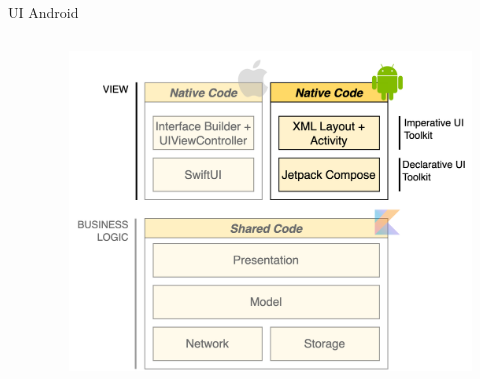 \begin{frame}{UI Android}
    \begin{columns}[onlytextwidth]
        \begin{column}{0.4\textwidth}

        \end{column}
        \begin{column}{0.6\textwidth}
             \begin{figure}[H]
                \includegraphics[width=1\textwidth]{img/stack_kmm_android.png}
            \end{figure}
        \end{column}
    \end{columns}
\end{frame}

